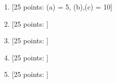 \documentclass[11pt]{article}
\begin{document}
\newpage
\setcounter{page}{1}
\begin{enumerate}

\item {[25 points: (a) = 5, (b),(c) = 10]} 


\newpage
\item {[25 points: ]}


\newpage
\item {[25 points: ]}


\newpage
\item {[25 points: ]}


\newpage
\item {[25 points: ]}


\end{enumerate}
\end{document}
